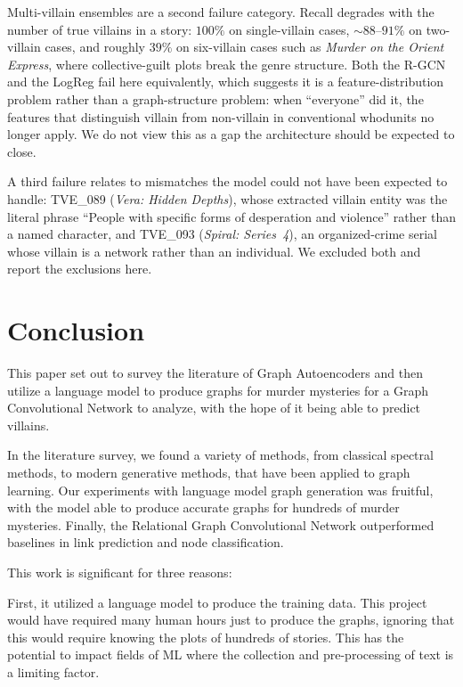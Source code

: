 \documentclass[11pt]{article}
\begin{document}
Multi-villain ensembles are a second failure category. Recall degrades with the number of true villains in a story: $100\%$ on single-villain cases, $\sim\!88$--$91\%$ on two-villain cases, and roughly $39\%$ on six-villain cases such as \emph{Murder on the Orient Express}, where collective-guilt plots break the genre structure. Both the R-GCN and the LogReg fail here equivalently, which suggests it is a feature-distribution problem rather than a graph-structure problem: when ``everyone'' did it, the features that distinguish villain from non-villain in conventional whodunits no longer apply. We do not view this as a gap the architecture should be expected to close.

A third failure relates to mismatches the model could not have been expected to handle: TVE\_089 (\emph{Vera: Hidden Depths}), whose extracted villain entity was the literal phrase ``People with specific forms of desperation and violence'' rather than a named character, and TVE\_093 (\emph{Spiral: Series~4}), an organized-crime serial whose villain is a network rather than an individual. We excluded both and report the exclusions here.






\section{Conclusion}

    This paper set out to survey the literature of Graph Autoencoders and then utilize a language model to produce graphs for murder mysteries for a Graph Convolutional Network to analyze, with the hope of it being able to predict villains.
    
    In the literature survey, we found a variety of methods, from classical spectral methods, to modern generative methods, that have been applied to graph learning. Our experiments with language model graph generation was fruitful, with the model able to produce accurate graphs for
    hundreds of murder mysteries. Finally, the Relational Graph Convolutional Network outperformed baselines in link prediction and node classification.
    
    This work is significant for three reasons: 
    
    First, it utilized a language model to produce the training data. This project would have required many human hours just to produce the graphs, ignoring that this would require knowing the plots of hundreds of stories. This has the potential to impact fields of ML where the collection and pre-processing of text is a limiting factor.
\end{document}
